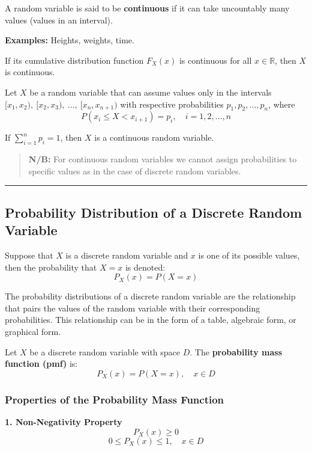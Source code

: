 \documentclass[
]{article}
\begin{document}
A random variable is said to be \textbf{continuous} if it can take
uncountably many values (values in an interval).

\textbf{Examples:} Heights, weights, time.

If its cumulative distribution function \(F_X(x)\) is continuous for all
\(x \in \mathbb{R}\), then \(X\) is continuous.

Let \(X\) be a random variable that can assume values only in the
intervals \([x_1, x_2),\ [x_2, x_3),\ \ldots,\ [x_n, x_{n+1})\) with
respective probabilities \(p_1, p_2, \ldots, p_n\), where
\[P(x_i \leq X < x_{i+1}) = p_i,\quad i = 1, 2, \ldots, n\]

If \(\sum_{i=1}^{n} p_i = 1\), then \(X\) is a continuous random
variable.

\begin{quote}
\textbf{N/B:} For continuous random variables we cannot assign
probabilities to specific values as in the case of discrete random
variables.
\end{quote}

\begin{center}\rule{0.5\linewidth}{0.5pt}\end{center}

\subsection{Probability Distribution of a Discrete Random
Variable}\label{probability-distribution-of-a-discrete-random-variable}

Suppose that \(X\) is a discrete random variable and \(x\) is one of its
possible values, then the probability that \(X = x\) is denoted:
\[P_X(x) = P(X = x)\]

The probability distributions of a discrete random variable are the
relationship that pairs the values of the random variable with their
corresponding probabilities. This relationship can be in the form of a
table, algebraic form, or graphical form.

Let \(X\) be a discrete random variable with space \(D\). The
\textbf{probability mass function (pmf)} is:
\[P_X(x) = P(X = x),\quad x \in D\]

\subsubsection{Properties of the Probability Mass
Function}\label{properties-of-the-probability-mass-function}

\textbf{1. Non-Negativity Property} \[P_X(x) \geq 0\]
\[0 \leq P_X(x) \leq 1,\quad x \in D\]
\end{document}
